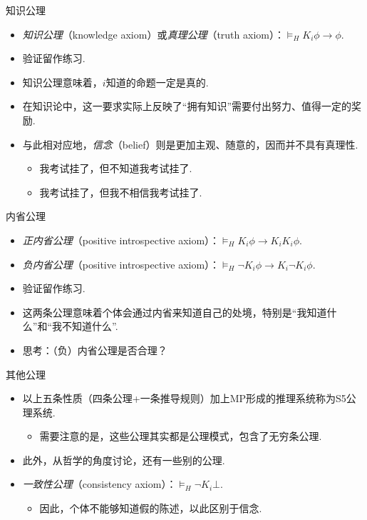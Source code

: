 \begin{frame}{知识公理}
\begin{itemize}
    \item \emph{知识公理}（knowledge axiom）或\emph{真理公理}（truth axiom）：$\vDash_H K_i\phi\to\phi$.
    \item 验证留作练习. %
    \item 知识公理意味着，$i$知道的命题一定是真的.
    \item 在知识论中，这一要求实际上反映了“拥有知识”需要付出努力、值得一定的奖励.
    \item 与此相对应地，\emph{信念}（belief）则是更加主观、随意的，因而并不具有真理性.
    \begin{itemize}
        \item 我考试挂了，但不知道我考试挂了.
        \item 我考试挂了，但我不相信我考试挂了.
    \end{itemize}
\end{itemize}
\end{frame}
\begin{frame}{内省公理}
\begin{itemize}
    \item \emph{正内省公理}（positive introspective axiom）：$\vDash_H K_i\phi\to K_iK_i\phi$.
    \item \emph{负内省公理}（positive introspective axiom）：$\vDash_H \neg K_i\phi\to K_i\neg K_i\phi$.
    \item 验证留作练习. %
    \item 这两条公理意味着个体会通过内省来知道自己的处境，特别是“我知道什么”和“我不知道什么”.
    \item 思考：（负）内省公理是否合理？
\end{itemize}
\end{frame}
\begin{frame}{其他公理}
\begin{itemize}
    \item 以上五条性质（四条公理+一条推导规则）加上MP形成的推理系统称为S5公理系统.
    \begin{itemize}
        \item 需要注意的是，这些公理其实都是公理模式，包含了无穷条公理.
    \end{itemize}
    \item 此外，从哲学的角度讨论，还有一些别的公理.
    \item \emph{一致性公理}（consistency axiom）：$\vDash_H\neg K_i\bot$.
    \begin{itemize}
        \item 因此，个体不能够知道假的陈述，以此区别于信念.
    \end{itemize}
\end{itemize}
\end{frame}
